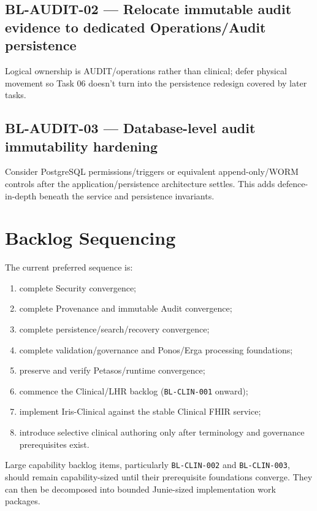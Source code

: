 \subsection{BL-AUDIT-02 --- Relocate immutable audit evidence to dedicated Operations/Audit persistence} 
Logical ownership is AUDIT/operations rather than clinical; defer physical movement so Task 06 doesn't turn into the persistence redesign covered by later tasks.

\subsection{BL-AUDIT-03 --- Database-level audit immutability hardening}
Consider PostgreSQL permissions/triggers or equivalent append-only/WORM controls after the application/persistence architecture settles. This adds defence-in-depth beneath the service and persistence invariants.

\section{Backlog Sequencing}

The current preferred sequence is:

\begin{enumerate}
    \item complete Security convergence;
    \item complete Provenance and immutable Audit convergence;
    \item complete persistence/search/recovery convergence;
    \item complete validation/governance and Ponos/Erga processing foundations;
    \item preserve and verify Petasos/runtime convergence;
    \item commence the Clinical/LHR backlog (\texttt{BL-CLIN-001} onward);
    \item implement Iris-Clinical against the stable Clinical FHIR service;
    \item introduce selective clinical authoring only after terminology and governance prerequisites exist.
\end{enumerate}

Large capability backlog items, particularly \texttt{BL-CLIN-002} and \texttt{BL-CLIN-003}, should remain capability-sized until their prerequisite foundations converge. They can then be decomposed into bounded Junie-sized implementation work packages.
